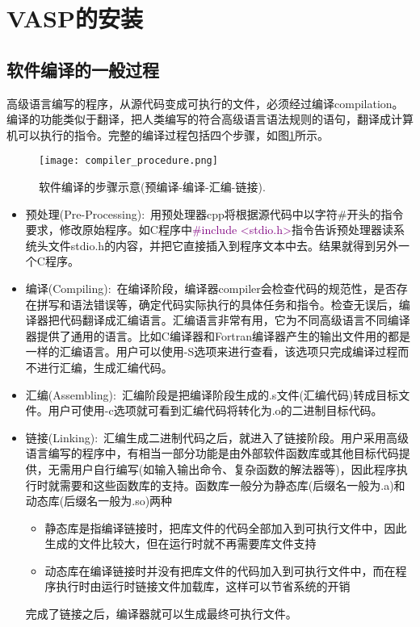\section{VASP的安装}
\subsection{软件编译的一般过程}\label{SubSec:Compilation}
高级语言编写的程序，从源代码变成可执行的文件，必须经过编译\textrm{compilation}。编译的功能类似于翻译，把人类编写的符合高级语言语法规则的语句，翻译成计算机可以执行的指令。完整的编译过程包括四个步骤，如图\ref{Fig:Compiler}所示。
\begin{figure}[h!]
\centering
\texttt{[image: compiler\_procedure.png]}
\caption{\small \textrm{软件编译的步骤示意(预编译-编译-汇编-链接).}}%
\label{Fig:Compiler}
\end{figure}
\begin{itemize}
	\item 预处理\textrm{(Pre-Processing)}:~用预处理器\textrm{cpp}将根据源代码中以字符\#开头的指令要求，修改原始程序。如\textrm{C}程序中\textcolor{purple}{\textrm{\#include <stdio.h>}}指令告诉预处理器读系统头文件\textrm{stdio.h}的内容，并把它直接插入到程序文本中去。结果就得到另外一个\textrm{C}程序。%
	\item 编译\textrm{(Compiling)}:~在编译阶段，编译器\textrm{compiler}会检查代码的规范性，是否存在拼写和语法错误等，确定代码实际执行的具体任务和指令。检查无误后，编译器把代码翻译成汇编语言。汇编语言非常有用，它为不同高级语言不同编译器提供了通用的语言。比如\textrm{C}编译器和\textrm{Fortran}编译器产生的输出文件用的都是一样的汇编语言。用户可以使用\textrm{-S}选项来进行查看，该选项只完成编译过程而不进行汇编，生成汇编代码。
	\item 汇编\textrm{(Assembling)}:~汇编阶段是把编译阶段生成的\textrm{.s}文件(汇编代码)转成目标文件。用户可使用\textrm{-c}选项就可看到汇编代码将转化为\textrm{.o}的二进制目标代码。
	\item 链接\textrm{(Linking)}:~汇编生成二进制代码之后，就进入了链接阶段。用户采用高级语言编写的程序中，有相当一部分功能是由外部软件函数库或其他目标代码提供，无需用户自行编写(如输入输出命令、复杂函数的解法器等)，因此程序执行时就需要和这些函数库的支持。函数库一般分为静态库(后缀名一般为\textrm{.a})和动态库(后缀名一般为\textrm{.so})两种
		\begin{itemize}
			\item 静态库是指编译链接时，把库文件的代码全部加入到可执行文件中，因此生成的文件比较大，但在运行时就不再需要库文件支持
			\item 动态库在编译链接时并没有把库文件的代码加入到可执行文件中，而在程序执行时由运行时链接文件加载库，这样可以节省系统的开销
		\end{itemize}
完成了链接之后，编译器就可以生成最终可执行文件。
\end{itemize}
